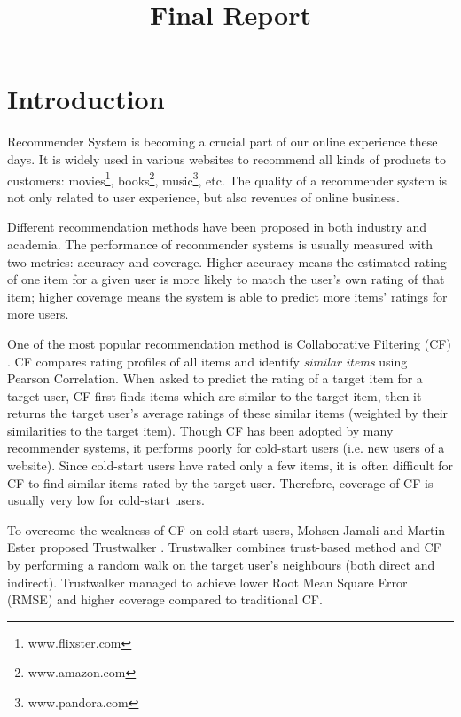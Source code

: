\documentclass[12pt]{article}
\title{Final Report}
\author{}
\begin{document}
\maketitle

\section{Introduction}
Recommender System is becoming a crucial part of our online experience these days. It is widely used in various websites to recommend all kinds of products to customers: movies\footnote[1]{www.flixster.com}, books\footnote[2]{www.amazon.com}, music\footnote[3]{www.pandora.com}, etc. The quality of a recommender system is not only related to user experience, but also revenues of online business.  

Different recommendation methods have been proposed in both industry and academia. The performance of recommender systems is usually measured with two metrics: accuracy and coverage. Higher accuracy means the estimated rating of one item for a given user is more likely to match the user's own rating of that item; higher coverage means the system is able to predict more items' ratings for more users. 

One of the most popular recommendation method is Collaborative Filtering (CF) \cite{Sarwar:2001p125}. CF compares rating profiles of all items and identify \emph{similar items} using Pearson Correlation. When asked to predict the rating of a target item for a target user, CF first finds items which are similar to the target item, then it returns the target user's average ratings of these similar items (weighted by their similarities to the target item). Though CF has been adopted by many recommender systems, it performs poorly for cold-start users (i.e. new users of a website). Since cold-start users have rated only a few items, it is often difficult for CF to find similar items rated by the target user. Therefore, coverage of CF is usually very low for cold-start users. 

To overcome the weakness of CF on cold-start users, Mohsen Jamali and Martin Ester proposed Trustwalker \cite{Jamali:2009p67}. Trustwalker combines trust-based method and CF by performing a random walk on the target user's neighbours (both direct and indirect). Trustwalker managed to achieve lower Root Mean Square Error (RMSE) and higher coverage compared to traditional CF. 
\end{document}
